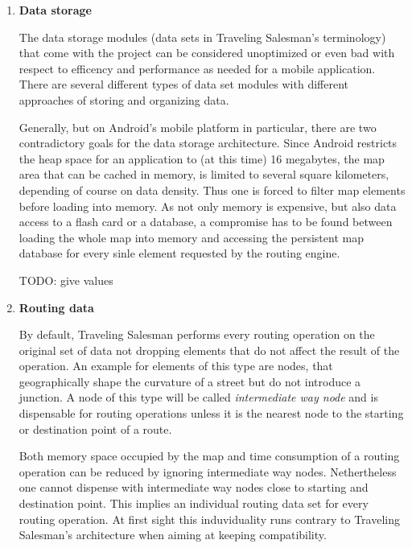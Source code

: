 \begin{enumerate}
	\item \textbf{Data storage}
	
		The data storage modules (data sets in Traveling Salesman's terminology) that come with the project can be considered unoptimized or even bad with respect to efficency and performance as needed for a mobile application. There are several different types of data set modules with different approaches of storing and organizing data.\newline
		
		Generally, but on Android's mobile platform in particular, there are two contradictory goals for the data storage architecture. Since Android restricts the heap space for an application to (at this time) 16 megabytes, the map area that can be cached in memory, is limited to several square kilometers, depending of course on data density. Thus one is forced to filter map elements before loading into memory.
		As not only memory is expensive, but also data access to a flash card or a database, a compromise has to be found between loading the whole map into memory and accessing the persistent map database for every sinle element requested by the routing engine. \newline
		
		TODO: give values
		
	\item \textbf{Routing data}
	
		By default, Traveling Salesman performs every routing operation on the original set of data not dropping elements that do not affect the result of the operation. An example for elements of this type are nodes, that geographically shape the curvature of a street but do not introduce a junction. A node of this type will be called \emph{intermediate way node} and is dispensable for routing operations unless it is the nearest node to the starting or destination point of a route.\newline
		
		Both memory space occupied by the map and time consumption of a routing operation can be reduced by ignoring intermediate way nodes. Nethertheless one cannot dispense with intermediate way nodes close to starting and destination point. This implies an individual routing data set for every routing operation. At first sight this induviduality runs contrary to Traveling Salesman's architecture when aiming at keeping compatibility.\newline			
		

\end{enumerate}
